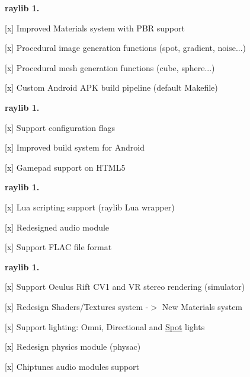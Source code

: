{\bfseries{raylib 1.}}
\begin{DoxyItemize}
\item \mbox{[}x\mbox{]} Improved Materials system with PBR support
\item \mbox{[}x\mbox{]} Procedural image generation functions (spot, gradient, noise...)
\item \mbox{[}x\mbox{]} Procedural mesh generation functions (cube, sphere...)
\item \mbox{[}x\mbox{]} Custom Android APK build pipeline (default Makefile)
\end{DoxyItemize}

{\bfseries{raylib 1.}}
\begin{DoxyItemize}
\item \mbox{[}x\mbox{]} Support configuration flags
\item \mbox{[}x\mbox{]} Improved build system for Android
\item \mbox{[}x\mbox{]} Gamepad support on HTML5
\end{DoxyItemize}

{\bfseries{raylib 1.}}
\begin{DoxyItemize}
\item \mbox{[}x\mbox{]} Lua scripting support (raylib Lua wrapper)
\item \mbox{[}x\mbox{]} Redesigned audio module
\item \mbox{[}x\mbox{]} Support FLAC file format
\end{DoxyItemize}

{\bfseries{raylib 1.}}
\begin{DoxyItemize}
\item \mbox{[}x\mbox{]} Support Oculus Rift CV1 and VR stereo rendering (simulator)
\item \mbox{[}x\mbox{]} Redesign Shaders/\+Textures system -\/$>$ New Materials system
\item \mbox{[}x\mbox{]} Support lighting\+: Omni, Directional and \mbox{\hyperlink{structSpot}{Spot}} lights
\item \mbox{[}x\mbox{]} Redesign physics module (physac)
\item \mbox{[}x\mbox{]} Chiptunes audio modules support
\end{DoxyItemize}


